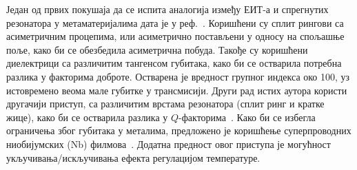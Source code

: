 \documentclass[main.tex]{subfiles}
\begin{document}
Један од првих покушаја да се испита аналогија између ЕИТ-а и спрегнутих резонатора у метаматеријалима дата је у реф.~\cite{tassin:09}. Коришћени су сплит рингови са асиметричним процепима, или асиметрично постављени у односу на спољашње поље, како би се обезбедила асиметрична побуда. Такође су коришћени диелектрици са различитим тангенсом губитака, како би се остварила потребна разлика у факторима доброте. Остварена је вредност групног индекса око 100, уз истовремено веома мале губитке у трансмисији. Други рад истих аутора користи другачији приступ, са различитим врстама резонатора (сплит ринг и кратке жице), како би се остварила разлика у $Q$-факторима~\cite{tassin2009planar}. Како би се избегла ограничења због губитака у металима, предложено је коришћење суперпроводних ниобијумских (Nb) филмова~\cite{cihan}. Додатна предност овог приступа је могућност укључивања/искључивања ефекта регулацијом температуре.



\end{document}

